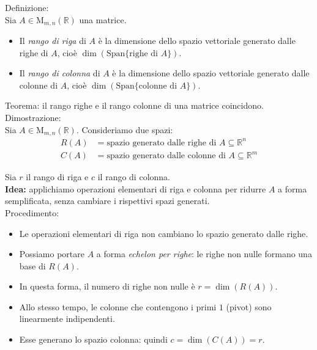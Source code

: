\documentclass[10pt]{extarticle}
\begin{document}
Definizione:\\
Sia $A \in \text{M}_{m,n}(\mathbb{R})$ una matrice.\\

\begin{itemize}
    \item Il \textit{rango di riga} di $A$ è la dimensione dello spazio vettoriale generato dalle righe di $A$, cioè $\dim(\text{Span}\{\text{righe di } A\})$.
    \item Il \textit{rango di colonna} di $A$ è la dimensione dello spazio vettoriale generato dalle colonne di $A$, cioè $\dim(\text{Span}\{\text{colonne di } A\})$.
\end{itemize}

Teorema: il rango righe e il rango colonne di una matrice coincidono.\\

Dimostrazione:\\
Sia $A \in \text{M}_{m,n}(\mathbb{R})$. Consideriamo due spazi:
\begin{align*}
    R(A) &= \text{spazio generato dalle righe di } A \subseteq \mathbb{R}^n \\
    C(A) &= \text{spazio generato dalle colonne di } A \subseteq \mathbb{R}^m
\end{align*}

Sia $r$ il rango di riga e $c$ il rango di colonna.\\

\textbf{Idea:} applichiamo operazioni elementari di riga e colonna per ridurre $A$ a forma semplificata, senza cambiare i rispettivi spazi generati.\\

Procedimento:
\begin{itemize}
    \item Le operazioni elementari di riga non cambiano lo spazio generato dalle righe.
    \item Possiamo portare $A$ a forma \textit{echelon per righe}: le righe non nulle formano una base di $R(A)$.
    \item In questa forma, il numero di righe non nulle è $r = \dim(R(A))$.
    \item Allo stesso tempo, le colonne che contengono i primi $1$ (pivot) sono linearmente indipendenti.
    \item Esse generano lo spazio colonna: quindi $c = \dim(C(A)) = r$.
\end{itemize}
\end{document}
